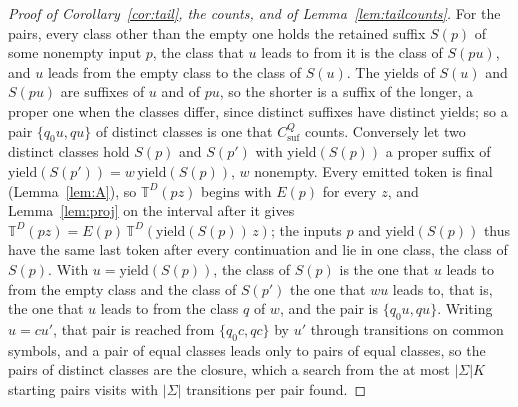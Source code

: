 \documentclass[11pt,a4paper]{article}
\theoremstyle{definition}
\theoremstyle{plain}
\newcommand{\T}{\mathbb{T}}
\newcommand{\yield}{\mathrm{yield}}
\begin{document}
\begin{proof}[Proof of Corollary~\ref{cor:tail}, the counts, and of Lemma~\ref{lem:tailcounts}]
For the pairs, every class other than the empty one holds the retained suffix \(S(p)\) of some nonempty input \(p\), the
class that \(u\) leads to from it is the class of \(S(pu)\), and \(u\) leads from the empty class to the class of
\(S(u)\). The yields of \(S(u)\) and \(S(pu)\) are suffixes of \(u\) and of \(pu\), so the shorter is a suffix of the
longer, a proper one when the classes differ, since distinct suffixes have distinct yields; so a pair \(\{q_0 u, qu\}\)
of distinct classes is one that \(C^{Q}_{\mathrm{suf}}\) counts. Conversely let two distinct classes hold \(S(p)\) and
\(S(p')\) with \(\yield(S(p))\) a proper suffix of \(\yield(S(p')) = w\,\yield(S(p))\), \(w\) nonempty. Every emitted
token is final (Lemma~\ref{lem:A}), so \(\T^D(pz)\) begins with \(E(p)\) for every \(z\), and Lemma~\ref{lem:proj} on
the interval after it gives \(\T^D(pz) = E(p)\,\T^D(\yield(S(p))\,z)\); the inputs \(p\) and \(\yield(S(p))\) thus have
the same last token after every continuation and lie in one class, the class of \(S(p)\). With \(u = \yield(S(p))\), the
class of \(S(p)\) is the one that \(u\) leads to from the empty class and the class of \(S(p')\) the one that \(wu\)
leads to, that is, the one that \(u\) leads to from the class \(q\) of \(w\), and the pair is \(\{q_0 u, qu\}\). Writing
\(u = cu'\), that pair is reached from \(\{q_0 c, qc\}\) by \(u'\) through transitions on common symbols, and a pair of
equal classes leads only to pairs of equal classes, so the pairs of distinct classes are the closure, which a search
from the at most \(|\Sigma| K\) starting pairs visits with \(|\Sigma|\) transitions per pair found.
\end{proof}
\end{document}
